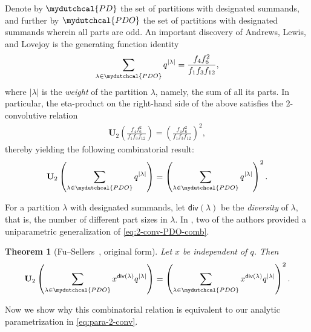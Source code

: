 \documentclass[12pt,reqno]{amsart}
\numberwithin{equation}{section}
\theoremstyle{plain}
\newtheorem{theorem}{Theorem}[section]
\theoremstyle{definition}
\theoremstyle{named}
\newcommand{\cPD}{\mydutchcal{PD}}
\newcommand{\cPDO}{\mydutchcal{PDO}}
\newcommand{\dis}{\mathsf{div}}
\newcommand{\UU}{\mathbf{U}}
\begin{document}
Denote by $\cPD$ the set of partitions with designated summands, and further by $\cPDO$ the set of partitions with designated summands wherein all parts are odd. An important discovery of Andrews, Lewis, and Lovejoy is the generating function identity~\cite[p.~52, eq.~(1.6)]{ALL2002}
\begin{align*}
	\sum_{\lambda\in \cPDO} q^{|\lambda|} = \frac{f_4 f_6^2}{f_1 f_3 f_{12}},
\end{align*}
where $|\lambda|$ is the \emph{weight} of the partition $\lambda$, namely, the sum of all its parts. In particular, the eta-product on the right-hand side of the above satisfies the $2$-convolutive relation~\cite[p.~63, Theorem~21]{ALL2002}
\begin{align}\label{eq:2-conv-PDO}
	\UU_2\left(\frac{f_4 f_6^2}{f_1 f_3 f_{12}}\right) = \left(\frac{f_4 f_6^2}{f_1 f_3 f_{12}}\right)^2,
\end{align}
thereby yielding the following combinatorial result:
\begin{align}\label{eq:2-conv-PDO-comb}
	\UU_2\left(\sum_{\lambda\in \cPDO} q^{|\lambda|}\right) = \left(\sum_{\lambda\in \cPDO} q^{|\lambda|}\right)^2.
\end{align}

For a partition $\lambda$ with designated summands, let $\dis(\lambda)$ be the \emph{diversity} of $\lambda$, that is, the number of different part sizes in $\lambda$. In \cite[p.~3, Theorem~1.3]{FuSel}, two of the authors provided a uniparametric generalization of \eqref{eq:2-conv-PDO-comb}.

\begin{theorem}[Fu--Sellers~\cite{FuSel}, original form]\label{th:FS}
	Let $x$ be independent of $q$. Then
	\begin{align}\label{eq:2-conv-PDO-dis-comb}
		\UU_2\left(\sum_{\lambda\in \cPDO} x^{\dis(\lambda)} q^{|\lambda|}\right) = \left(\sum_{\lambda\in \cPDO} x^{\dis(\lambda)} q^{|\lambda|}\right)^2.
	\end{align}
\end{theorem}

Now we show why this combinatorial relation is equivalent to our analytic parametrization in \eqref{eq:para-2-conv}. 
\end{document}
